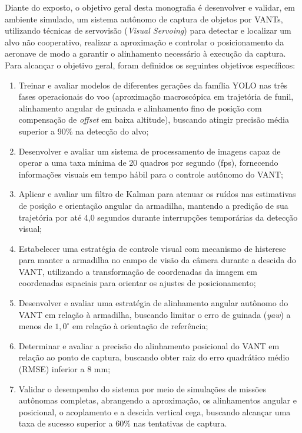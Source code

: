 Diante do exposto, o objetivo geral desta monografia é desenvolver e validar, em ambiente simulado, um sistema autônomo de captura de objetos por VANTs, utilizando técnicas de servovisão (\textit{Visual Servoing}) para detectar e localizar um alvo não cooperativo, realizar a aproximação e controlar o posicionamento da aeronave de modo a garantir o alinhamento necessário à execução da captura. Para alcançar o objetivo geral, foram definidos os seguintes objetivos específicos:

\begin{enumerate}

	\item Treinar e avaliar modelos de diferentes gerações da família YOLO nas três fases operacionais do voo (aproximação macroscópica em trajetória de funil, alinhamento angular de guinada e alinhamento fino de posição com compensação de \textit{offset} em baixa altitude), buscando atingir precisão média superior a 90\% na detecção do alvo;

	\item Desenvolver e avaliar um sistema de processamento de imagens capaz de operar a uma taxa mínima de 20 quadros por segundo (fps), fornecendo informações visuais em tempo hábil para o controle autônomo do VANT;

	\item Aplicar e avaliar um filtro de Kalman para atenuar os ruídos nas estimativas de posição e orientação angular da armadilha, mantendo a predição de sua trajetória por até 4,0 segundos durante interrupções temporárias da detecção visual;

	\item Estabelecer uma estratégia de controle visual com mecanismo de histerese para manter a armadilha no campo de visão da câmera durante a descida do VANT, utilizando a transformação de coordenadas da imagem em coordenadas espaciais para orientar os ajustes de posicionamento;

	\item Desenvolver e avaliar uma estratégia de alinhamento angular autônomo do VANT em relação à armadilha, buscando limitar o erro de guinada (\textit{yaw}) a menos de $1{,}0^\circ$ em relação à orientação de referência;

	\item Determinar e avaliar a precisão do alinhamento posicional do VANT em relação ao ponto de captura, buscando obter raiz do erro quadrático médio (RMSE) inferior a 8 mm;

	\item Validar o desempenho do sistema por meio de simulações de missões autônomas completas, abrangendo a aproximação, os alinhamentos angular e posicional, o acoplamento e a descida vertical cega, buscando alcançar uma taxa de sucesso superior a 60\% nas tentativas de captura.

\end{enumerate}

